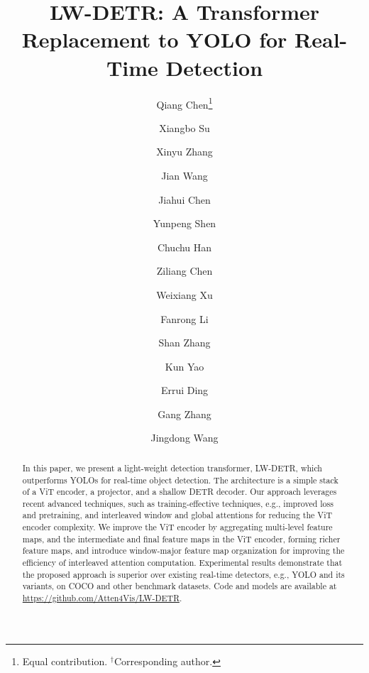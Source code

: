 \documentclass[runningheads]{llncs}
\begin{document}
\title{LW-DETR: A Transformer Replacement to YOLO for Real-Time Detection}


\author{Qiang Chen\thanks{Equal contribution. \quad$^{\dag}$Corresponding author.} \and
Xiangbo Su \and
Xinyu Zhang \and
Jian Wang \and
Jiahui Chen \and
Yunpeng Shen \and
Chuchu Han \and
Ziliang Chen \and
Weixiang Xu \and
Fanrong Li \and
Shan Zhang \and
Kun Yao \and
Errui Ding \and
Gang Zhang \and
Jingdong Wang\inst{1\dag}
}



\maketitle


\begin{abstract}
  In this paper, we present a light-weight detection transformer, LW-DETR, which outperforms YOLOs for real-time object detection. The architecture is a simple stack of a ViT encoder, a projector, and a shallow DETR decoder. Our approach leverages recent advanced techniques, such as training-effective techniques, e.g., improved loss and pretraining, and interleaved window and global attentions for reducing the ViT encoder complexity. We improve the ViT encoder by aggregating multi-level feature maps, and the intermediate and final feature maps in the ViT encoder, forming richer feature maps, and introduce window-major feature map organization for improving the efficiency of interleaved attention computation. Experimental results demonstrate that the proposed approach is superior over existing real-time detectors, e.g., YOLO and its variants, on COCO and other benchmark datasets. Code and models are available at \url{https://github.com/Atten4Vis/LW-DETR}.
\end{abstract}
\end{document}

